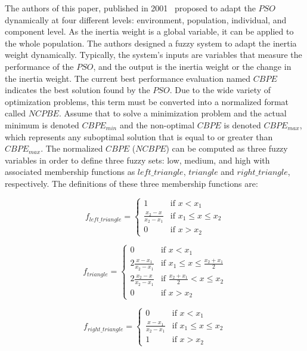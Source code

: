 The authors of this paper, published in 2001~\cite{shi2001fuzzy} proposed to adapt the $PSO$ dynamically at four different levels: environment, population, individual, and component level. As the inertia weight is a global variable, it can be applied to the whole population. The authors designed a fuzzy system to adapt the inertia weight dynamically. Typically, the system's inputs are variables that measure the performance of the $PSO$, and the output is the inertia weight or the change in the inertia weight. The current best performance evaluation named $CBPE$ indicates the best solution found by the $PSO$. Due to the wide variety of optimization problems, this term must be converted into a normalized format called $NCPBE$. Assume that to solve a minimization problem and the actual minimum is denoted $CBPE_{min}$ and the non-optimal $CBPE$ is denoted $CBPE_{max}$, which represents any suboptimal solution that is equal to or greater than $CBPE_{max}$. The normalized $CBPE$ ($NCBPE$) can be computed as three fuzzy variables in order to define three fuzzy sets: low, medium, and high with associated membership functions as $left\_triangle$, $triangle$ and $right\_triangle$, respectively. The definitions of these three membership functions are: 

\begin{equation}
    f_{left\_triangle}=
    \begin{cases}
    1 & \text{if $x < x_1$}\\
    \frac{x_2 -x}{x_2 -x_1} & \text{if $x_1 \leq x \leq x_2$}\\
    0 & \text{if $x > x_2$}
    \end{cases}
\end{equation}

\begin{equation}
    f_{triangle}= \begin{cases}
    0 & \text{if $x<x_1$}\\
    2 \frac{x - x_1}{x_2 -x_1} & \text{if $x_1 \leq x \leq \frac{x_2 +x_1}{2}$}\\
    2 \frac{x_2 -x}{x_2 -x_1} & \text{if $\frac{x_2 +x_1}{2} < x \leq x_2$}\\
    0 & \text{if $x > x_2$}
    \end{cases}
\end{equation}

\begin{equation}
    f_{right\_triangle} = \begin{cases}
    0 & \text{if $x < x_1$}\\
    \frac{x -x_1}{x_2 -x_1} & \text{if $x_1 \leq x \leq x_2$}\\
    1 & \text{if $x > x_2$}
    \end{cases}
\end{equation}

